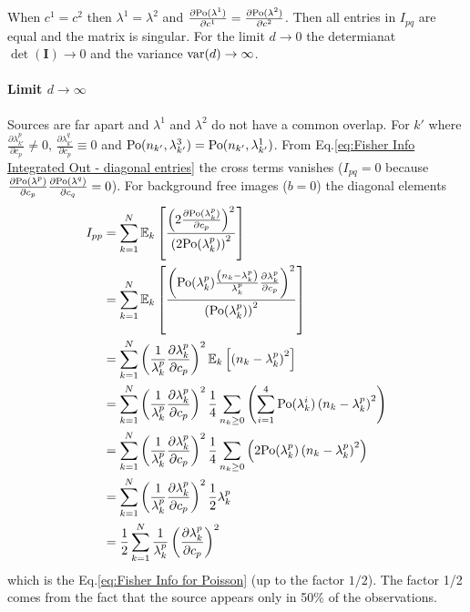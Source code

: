 When $c^1=c^2$ then $\lambda^1=\lambda^2$ and $\frac{\partial\mathrm{Po}(\lambda^1)}{\partial c^1}=\frac{\partial\mathrm{Po}(\lambda^2)}{\partial c^2}$.
Then all entries in $I_{pq}$ are equal and the matrix is singular. For the limit $d\rightarrow0$ the determianat $\det(\bm{I})\rightarrow0$ and the variance $\mathrm{var}(d)\rightarrow\infty$.

\paragraph*{Limit $d\rightarrow\infty$}

Sources are far apart and $\lambda^1$ and $\lambda^2$ do not have a common overlap. For $k'$ where $\frac{\partial\lambda_{k'}^p}{\partial c_p}\neq0,\,\frac{\partial\lambda_{k'}^q}{\partial c_p}\equiv0$ and $\mathrm{Po}(n_{k'},\lambda_{k'}^{3})=\mathrm{Po}(n_{k'},\lambda_{k'}^1)$.
From Eq.\eqref{eq:Fisher Info Integrated Out - diagonal entries} the cross terms vanishes ($I_{pq}=0$ because $\frac{\partial\mathrm{Po}(\lambda^p)}{\partial c_p}\frac{\partial\mathrm{Po}(\lambda^q)}{\partial c_{q}}=0$). For background free images ($b=0$) the diagonal elements 
%
\begin{alignat*}{1}
	I_{pp} & =\sum_{k=1}^N\mathbb{E}_k\left[\frac{\left(2\frac{\partial\mathrm{Po}(\lambda_k^p)}{\partial c_p}\right)^2}{\left(2\mathrm{Po}(\lambda_k^p)\right)^2}\right]\\
 	& =\sum_{k=1}^N\mathbb{E}_k\left[\frac{\left(\mathrm{Po}(\lambda_k^p)\frac{\left(n_k-\lambda_k^p\right)}{\lambda_k^p}\frac{\partial\lambda_k^p}{\partial c_p}\right)^2}{\left(\mathrm{Po}(\lambda_k^p)\right)^2}\right]\\
 	& =\sum_{k=1}^N\left(\frac{1}{\lambda_k^p}\frac{\partial\lambda_k^p}{\partial c_p}\right)^2\mathbb{E}_k\left[\left(n_k-\lambda_k^p\right)^2\right]\\
 	& =\sum_{k=1}^N\left(\frac{1}{\lambda_k^p}\frac{\partial\lambda_k^p}{\partial c_p}\right)^2\frac{1}{4}\sum_{n_k\geq0}\left(\sum_{i=1}^{4}\mathrm{Po}(\lambda_k^i)\left(n_k-\lambda_k^p\right)^2\right)\\
 	& =\sum_{k=1}^N\left(\frac{1}{\lambda_k^p}\frac{\partial\lambda_k^p}{\partial c_p}\right)^2\frac{1}{4}\sum_{n_k\geq0}\left(2\mathrm{Po}(\lambda_k^p)\left(n_k-\lambda_k^p\right)^2\right)\\
 	& =\sum_{k=1}^N\left(\frac{1}{\lambda_k^p}\frac{\partial\lambda_k^p}{\partial c_p}\right)^2\frac{1}{2}\lambda_k^p\\
 	& =\frac{1}{2}\sum_{k=1}^N\frac{1}{\lambda_k^p}\left(\frac{\partial\lambda_k^p}{\partial c_p}\right)^2
\end{alignat*}
%
which is the Eq.\eqref{eq:Fisher Info for Poisson} (up to the factor $1/2$). The factor 1/2 comes from the fact that the source appears only in 50\% of the observations.

